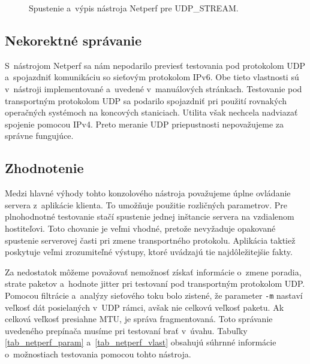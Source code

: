       \begin{figure}[H]
           \begin{center}
               \caption{Spustenie a~výpis nástroja Netperf pre UDP\_STREAM.}
               \label{netperf_ipv6_udp}
           \end{center}
       \end{figure}

        \subsection{Nekorektné správanie} \label{netperf_chyby}
        S~nástrojom Netperf sa nám nepodarilo previesť testovania pod protokolom
        UDP a~spojazdniť komunikáciu so sieťovým protokolom IPv6. Obe tieto 
        vlastnosti sú v~nástroji implementované a~uvedené v~manuálových
        stránkach. Testovanie pod transportným protokolom UDP sa podarilo 
        spojazdniť pri použití rovnakých operačných systémoch na koncových
        staniciach. Utilita však nechcela nadviazať spojenie pomocou IPv4.
        Preto meranie UDP priepustnosti nepovažujeme za správne fungujúce.

        \subsection{Zhodnotenie} \label{netperf_zhod}
        Medzi hlavné výhody tohto konzolového nástroja považujeme úplne
        ovládanie servera z~aplikácie klienta. To umožňuje použitie rozličných
        parametrov. Pre plnohodnotné testovanie stačí spustenie jednej inštancie
        servera na vzdialenom hostiteľovi. Toto chovanie je veľmi vhodné,
        pretože nevyžaduje opakované spustenie serverovej časti pri zmene
        transportného protokolu. Aplikácia taktiež poskytuje veľmi zrozumiteľné
        výstupy, ktoré uvádzajú tie najdôležitejšie fakty.

        Za nedostatok môžeme považovať nemožnosť získať informácie
        o~zmene poradia, strate paketov a~hodnote jitter pri
        testovaní pod transportným protokolom UDP. 
        Pomocou filtrácie a~analýzy sieťového toku bolo zistené, že parameter \texttt{-m} 
        nastaví veľkosť dát posielaných v~UDP rámci, avšak nie celkovú veľkosť
        paketu. Ak celková veľkosť presiahne
        MTU, je správa fragmentovaná. Toto správanie uvedeného prepínača musíme 
        pri testovaní brať v~úvahu. 
        Tabuľky \ref{tab_netperf_param} a~\ref{tab_netperf_vlast} obsahujú
        súhrnné informácie o~možnostiach testovania pomocou tohto nástroja.

